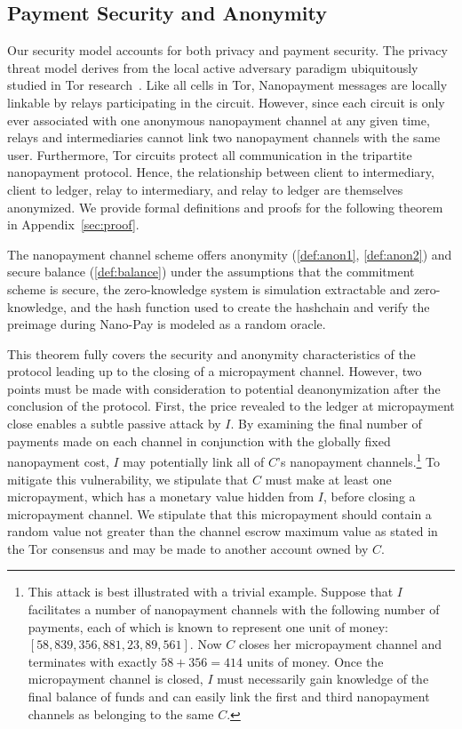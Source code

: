 \subsection{Payment Security and Anonymity} \label{subsec:paysecurity} Our security model accounts for both privacy and payment security.
The privacy threat model derives from the local active adversary paradigm ubiquitously studied in Tor research~\cite{dingledine2004tor}.
Like all cells in Tor, Nanopayment messages are locally linkable by relays participating in the circuit.
However, since each circuit is only ever associated with one anonymous nanopayment channel at any given time, relays and intermediaries cannot link two nanopayment channels with the same user.
Furthermore, Tor circuits protect all communication in the tripartite nanopayment protocol.
Hence, the relationship between client to intermediary, client to ledger, relay to intermediary, and relay to ledger are themselves anonymized.
We provide formal definitions and proofs for the following theorem in Appendix~\ref{sec:proof}.

\begin{theorem}

  The nanopayment channel scheme offers anonymity (\ref{def:anon1}, \ref{def:anon2}) and secure balance (\ref{def:balance}) under the assumptions that the commitment scheme is secure, the zero-knowledge system is simulation extractable and zero-knowledge, and the hash function used to create the hashchain and verify the preimage during Nano-Pay is modeled as a random oracle.

\end{theorem}

This theorem fully covers the security and anonymity characteristics of the protocol leading up to the closing of a micropayment channel.
However, two points must be made with consideration to potential deanonymization after the conclusion of the protocol.
First, the price revealed to the ledger at micropayment close enables a subtle passive attack by $I$.
By examining the final number of payments made on each channel in conjunction with the globally fixed nanopayment cost, $I$ may potentially link all of $C$'s nanopayment channels.\footnote{This attack is best illustrated with a trivial example.
Suppose that $I$ facilitates a number of nanopayment channels with the following number of payments, each of which is known to represent one unit of money: $[58, 839, 356, 881, 23, 89, 561]$.
Now $C$ closes her micropayment channel and terminates with exactly $58 + 356 = 414$ units of money.
Once the micropayment channel is closed, $I$ must necessarily gain knowledge of the final balance of funds and can easily link the first and third nanopayment channels as belonging to the same $C$.}
To mitigate this vulnerability, we stipulate that $C$ must make at least one micropayment, which has a monetary value hidden from $I$, before closing a micropayment channel.
We stipulate that this micropayment should contain a random value not greater than the channel escrow maximum value as stated in the Tor consensus and may be made to another account owned by $C$.

